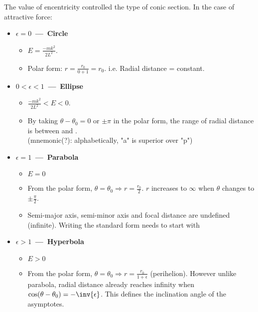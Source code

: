 \documentclass[class=article, crop=false, 12pt]{standalone}
\begin{document}
The value of encentricity controlled the type of conic section. 
In the case of attractive force:

\begin{itemize}
    \item \textbf{$\epsilon = 0$ \,---\, Circle}
    \begin{itemize}
        \item $E = \frac{-mk^2}{2L^2}$.
        \item Polar form: $r=\frac{r_0}{0+1} = r_0$. i.e. Radial distance = constant.
    \end{itemize}
    \item \textbf{$0<\epsilon<1 $ \,---\, Ellipse}
    \begin{itemize}
        \item $ \frac{-mk^2}{2L^2} < E < 0$.
        \item By taking $\theta-\theta_0 = 0$ or $\pm\pi$ in the polar form, the range of radial distance is between  and . \\
        (mnemonic(?): alphabetically, "a" is superior over "p")



    \end{itemize}
    \item \textbf{$\epsilon=1$ \,---\, Parabola}
    \begin{itemize}
        \item $E=0$
        \item From the polar form, $\theta=\theta_0 \Rightarrow r=\frac{r_0}{2}$. $r$ increases to $\infty$ when $\theta$ changes to $\pm\frac{\pi}{2}$.
        \item Semi-major axis, semi-minor axis and focal distance are undefined (infinite). 
        Writing the standard form needs to start with



    \end{itemize}
    \item \textbf{$\epsilon>1$ \,---\, Hyperbola}
    \begin{itemize}
        \item $E>0$
        \item From the polar form, $\theta=\theta_0 \Rightarrow r=\frac{r_0}{1+\epsilon}$ (perihelion). 
        However unlike parabola, radial distance already reaches infinity when $\cos(\theta-\theta_0)=-\inv{\epsilon}$.
        This defines the inclination angle of the asymptotes.


\end{itemize}
\end{itemize}
\end{document}
